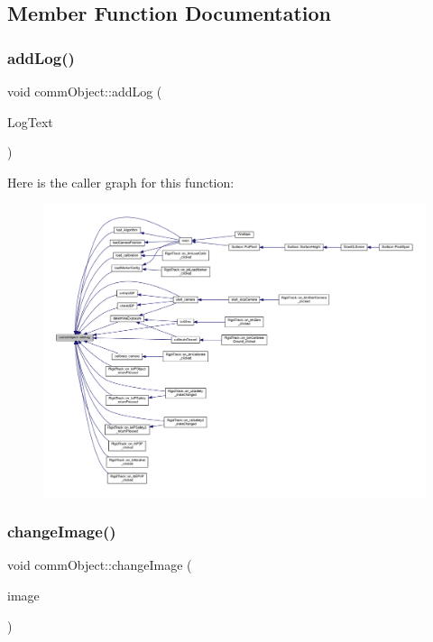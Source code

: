 \subsection{Member Function Documentation}
\mbox{\label{classcomm_object_aec354c7099b3039083cc4224e071e022}} 
\subsubsection{add\+Log()}
{\footnotesize\ttfamily void comm\+Object\+::add\+Log (\begin{DoxyParamCaption}\item[{Q\+String}]{Log\+Text }\end{DoxyParamCaption})}

Here is the caller graph for this function\+:\nopagebreak
\begin{figure}[H]
\begin{center}
\leavevmode
\includegraphics[width=350pt]{classcomm_object_aec354c7099b3039083cc4224e071e022_icgraph}
\end{center}
\end{figure}
\mbox{\label{classcomm_object_a6f81522c2aa1668fa402f08710e6206b}} 
\subsubsection{change\+Image()}
{\footnotesize\ttfamily void comm\+Object\+::change\+Image (\begin{DoxyParamCaption}\item[{Q\+Pixmap}]{image }\end{DoxyParamCaption})}

